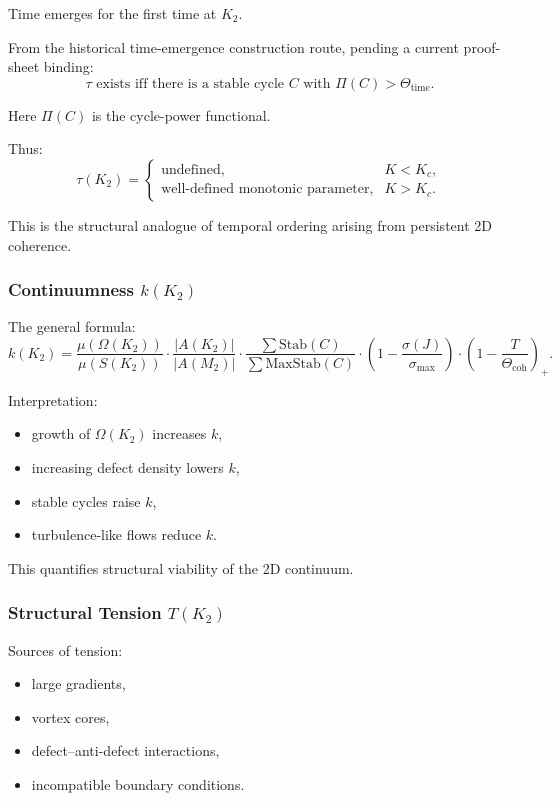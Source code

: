 Time emerges for the first time at $K_2$.

From the historical time-emergence construction route, pending a current proof-sheet binding:
\[
\tau \text{ exists iff there is a stable cycle }
C \text{ with } \Pi(C) > \Theta_{\mathrm{time}}.
\]

Here $\Pi(C)$ is the cycle-power functional.

Thus:
\[
\tau(K_2) =
\begin{cases}
\text{undefined}, & K < K_c, \\
\text{well-defined monotonic parameter}, & K > K_c.
\end{cases}
\]

This is the structural analogue of temporal ordering arising from
persistent 2D coherence.

\subsubsection{Continuumness \texorpdfstring{$k(K_2)$}{k(K_2)}}

The general formula:
\[
k(K_2) =
\frac{\mu(\Omega(K_2))}{\mu(S(K_2))}
\cdot
\frac{|A(K_2)|}{|A(M_2)|}
\cdot
\frac{\sum \mathrm{Stab}(C)}{\sum \mathrm{MaxStab}(C)}
\cdot
\left(1 - \frac{\sigma(J)}{\sigma_{\max}}\right)
\cdot
\left(1 - \frac{T}{\Theta_{\mathrm{coh}}}\right)_+.
\]

Interpretation:
\begin{itemize}
    \item growth of $\Omega(K_2)$ increases $k$,
    \item increasing defect density lowers $k$,
    \item stable cycles raise $k$,
    \item turbulence-like flows reduce $k$.
\end{itemize}

This quantifies structural viability of the 2D continuum.

\subsubsection{Structural Tension \texorpdfstring{$T(K_2)$}{T(K_2)}}

Sources of tension:
\begin{itemize}
    \item large gradients,
    \item vortex cores,
    \item defect–anti-defect interactions,
    \item incompatible boundary conditions.
\end{itemize}


